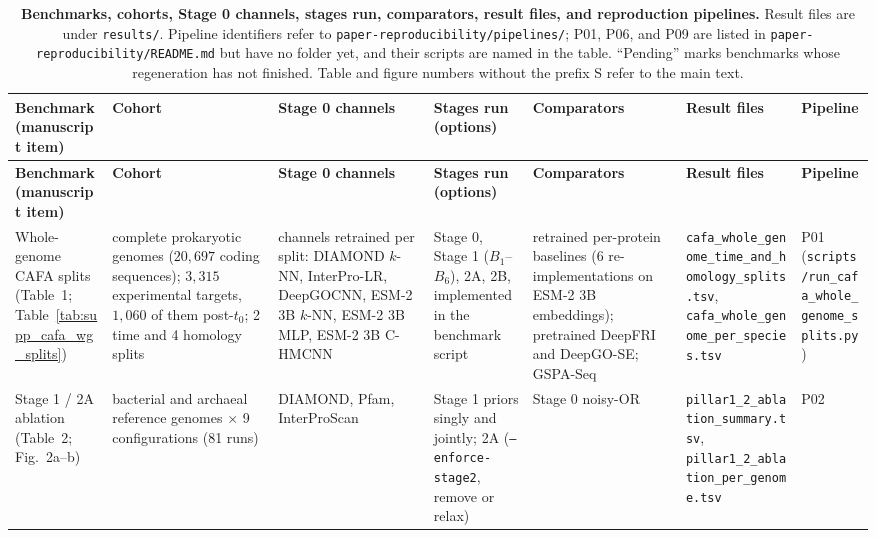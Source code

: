 \documentclass[10pt]{article}
\newcommand{\fn}[1]{\nolinkurl{#1}}
\begin{document}
{\scriptsize
\setlength{\tabcolsep}{2.5pt}
\begin{longtable}{>{\raggedright\arraybackslash}p{}>{\raggedright\arraybackslash}p{}>{\raggedright\arraybackslash}p{}>{\raggedright\arraybackslash}p{}>{\raggedright\arraybackslash}p{}>{\raggedright\arraybackslash}p{}>{\raggedright\arraybackslash}p{}}
  \caption{\textbf{Benchmarks, cohorts, Stage 0 channels, stages run, comparators, result files, and reproduction pipelines.} Result files are under \texttt{results/}. Pipeline identifiers refer to \texttt{paper-reproducibility/pipelines/}; P01, P06, and P09 are listed in \texttt{paper-reproducibility/README.md} but have no folder yet, and their scripts are named in the table. ``Pending'' marks benchmarks whose regeneration has not finished. Table and figure numbers without the prefix S refer to the main text.}
  \label{tab:supp_suites}\\
  \toprule
  \textbf{Benchmark (manuscript item)} & \textbf{Cohort} & \textbf{Stage 0 channels} & \textbf{Stages run (options)} & \textbf{Comparators} & \textbf{Result files} & \textbf{Pipeline} \\
  \midrule
  \endfirsthead
  \toprule
  \textbf{Benchmark (manuscript item)} & \textbf{Cohort} & \textbf{Stage 0 channels} & \textbf{Stages run (options)} & \textbf{Comparators} & \textbf{Result files} & \textbf{Pipeline} \\
  \midrule
  \endhead
  \bottomrule
  \endfoot
  Whole-genome CAFA splits (Table~1; Table~\ref{tab:supp_cafa_wg_splits}) & 6 complete prokaryotic genomes ($20{,}697$ coding sequences); $3{,}315$ experimental targets, $1{,}060$ of them post-$t_0$; 2 time and 4 homology splits & 6 channels retrained per split: DIAMOND $k$-NN, InterPro-LR, DeepGOCNN, ESM-2 3B $k$-NN, ESM-2 3B MLP, ESM-2 3B C-HMCNN & Stage 0, Stage 1 ($B_1$--$B_6$), 2A, 2B, implemented in the benchmark script & 14 retrained per-protein baselines (6 re-implementations on ESM-2 3B embeddings); pretrained DeepFRI and DeepGO-SE; GSPA-Seq & \fn{cafa_whole_genome_time_and_homology_splits.tsv}, \fn{cafa_whole_genome_per_species.tsv} & P01 (\fn{scripts/run_cafa_whole_genome_splits.py}) \\
  Stage 1 / 2A ablation (Table~2; Fig.~2a--b) & 9 bacterial and archaeal reference genomes $\times$ 9 configurations (81 runs) & DIAMOND, Pfam, InterProScan & Stage 1 priors singly and jointly; 2A (\texttt{--enforce-stage2}, remove or relax) & Stage 0 noisy-OR & \fn{pillar1_2_ablation_summary.tsv}, \fn{pillar1_2_ablation_per_genome.tsv} & P02 \\

\end{longtable}}
\end{document}
